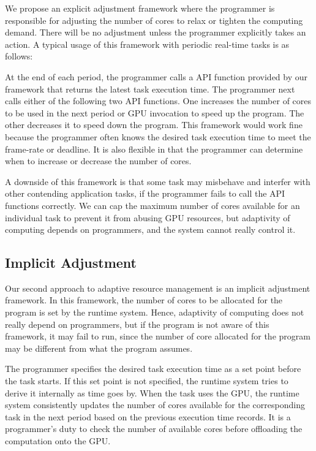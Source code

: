 \documentclass[times, 10pt, twocolumn]{article}
\begin{document}
We propose an explicit adjustment framework where the programmer is
responsible for adjusting the number of cores to relax or tighten
the computing demand.
There will be no adjustment unless the programmer explicitly takes an
action.
A typical usage of this framework with periodic real-time tasks is as
follows:

At the end of each period, the programmer calls a API function provided
by our framework that returns the latest task execution time.
The programmer next calls either of the following two API functions.
One increases the number of cores to be used in the next period or GPU
invocation to speed up the program.
The other decreases it to speed down the program.
This framework would work fine because the programmer often knows the
desired task execution time to meet the frame-rate or deadline.
It is also flexible in that the programmer can determine when to
increase or decrease the number of cores.

A downside of this framework is that some task may misbehave
and interfer with other contending application tasks, if the programmer
fails to call the API functions correctly.
We can cap the maximum number of cores available for an individual task
to prevent it from abusing GPU resources, but adaptivity of computing
depends on programmers, and the system cannot really control it.

\subsection{Implicit Adjustment}

Our second approach to adaptive resource management is an implicit
adjustment framework.
In this framework, the number of cores to be allocated for the program
is set by the runtime system.
Hence, adaptivity of computing does not really depend on programmers,
but if the program is not aware of this framework, it may fail to run,
since the number of core allocated for the program may be different from
what the program assumes.

The programmer specifies the desired task execution time as a set point
before the task starts.
If this set point is not specified, the runtime system tries to derive
it internally as time goes by.
When the task uses the GPU, the runtime system consistently updates the
number of cores available for the corresponding task in the next period
based on the previous execution time records.
It is a programmer's duty to check the number of available cores before
offloading the computation onto the GPU.
\end{document}

